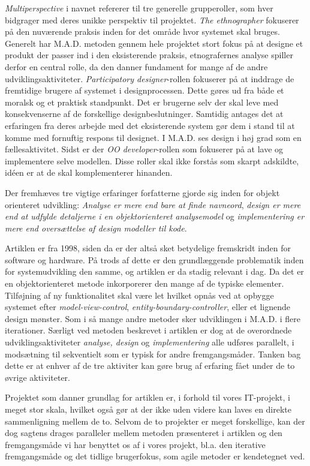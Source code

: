 \documentclass[11pt, a4paper]{article}
\begin{document}
\emph{Multiperspective} i navnet refererer til tre generelle grupperoller, som hver bidgrager med deres unikke perspektiv til projektet. 
\emph{The ethnographer} fokuserer på den nuværende praksis inden for det område hvor systemet skal bruges. Generelt har M.A.D. metoden gennem hele projektet stort fokus på at designe et produkt der passer ind i den eksisterende praksis, etnografernes analyse spiller derfor en central rolle, da den danner fundament for mange af de andre udviklingsaktiviteter. \emph{Participatory designer}-rollen fokuserer på at inddrage de fremtidige brugere af systemet i designprocessen. Dette gøres ud fra både et moralsk og et praktisk standpunkt. Det er brugerne selv der skal leve med konsekvenserne af de forskellige designbeslutninger. Samtidig antages det at erfaringen fra deres arbejde med det eksisterende system gør dem i stand til at komme med fornuftig respons til designet. I M.A.D. ses design i høj grad som en fællesaktivitet. Sidst er der \emph{OO developer}-rollen som fokuserer på at lave og implementere selve modellen. Disse roller skal ikke forstås som skarpt adskildte, idéen er at de skal komplementerer hinanden.

Der fremhæves tre vigtige erfaringer forfatterne gjorde sig inden for objekt orienteret udvikling: \emph{Analyse er mere end bare at finde navneord}, \emph{design er mere end at udfylde detaljerne i en objektorienteret analysemodel} og \emph{implementering er mere end oversættelse af design modeller til kode}.

Artiklen er fra 1998, siden da er der altså sket betydelige fremskridt inden for software og hardware. På trods af dette er den grundlæggende problematik inden for systemudvikling den samme, og artiklen er da stadig relevant i dag. Da det er en objektorienteret metode inkorporerer den mange af de typiske elementer. Tilføjning af ny funktionalitet skal være let hvilket opnås ved at opbygge systemet efter \emph{model-view-control}, \emph{entity-boundary-controller}, eller et lignende design mønster. Som i så mange andre metoder sker udviklingen i M.A.D. i flere iterationer. Særligt ved metoden beskrevet i artiklen er dog at de overordnede udviklingsaktiviteter \emph{analyse, design} og \emph{implementering} alle udføres parallelt, i modsætning til sekventielt som er typisk for andre fremgangsmåder. Tanken bag dette er at enhver af de tre aktiviter kan gøre brug af erfaring fået under de to øvrige aktiviteter.

Projektet som danner grundlag for artiklen er, i forhold til vores IT-projekt, i meget stor skala, hvilket også gør at der ikke uden videre kan laves en direkte sammenligning mellem de to. Selvom de to projekter er meget forskellige, kan der dog sagtens drages paralleler mellem metoden præsenteret i artiklen og den fremgangsmåde vi har benyttet os af i vores projekt, bl.a. den iterative fremgangsmåde og det tidlige brugerfokus, som agile metoder er kendetegnet ved.
\end{document}
